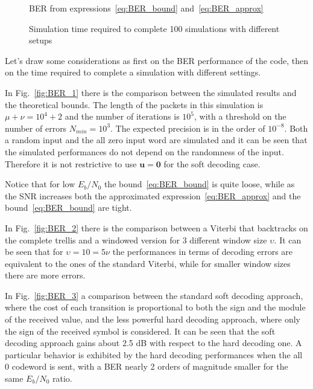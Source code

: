 \documentclass[10pt]{article}
\newlength\fheight
\newlength\fwidth
\begin{document}
\begin{figure}[t]
\centering
\setlength{}
\setlength{}

\caption{BER from expressions~\eqref{eq:BER_bound} and~\eqref{eq:BER_approx}}
\label{fig:BER_theory}
\end{figure}


\begin{figure}[t]
\centering
\setlength{}
\setlength{}

\caption{Simulation time required to complete 100 simulations with different setups}
\label{fig:perf}
\end{figure}

Let's draw some considerations as first on the BER performance of the code, then on the time required to complete a simulation with different settings.

In Fig.~\ref{fig:BER_1} there is the comparison between the simulated results and the theoretical bounds. The length of the packets in this simulation is $\mu + \nu = 10^4 + 2$ and the number of iterations is $10^5$, with a threshold on the number of errors $N_{min} = 10^3$. The expected precision is in the order of $10^{-8}$. Both a random input and the all zero input word are simulated and it can be seen that the simulated performances do not depend on the randomness of the input. Therefore it is not restrictive to use $\mathbf{u} = \mathbf{0}$ for the soft decoding case.

Notice that for low $E_b/N_0$ the bound~\eqref{eq:BER_bound} is quite loose, while as the SNR increases both the approximated expression~\eqref{eq:BER_approx} and the bound~\eqref{eq:BER_bound} are tight. 

In Fig.~\ref{fig:BER_2} there is the comparison between a Viterbi that backtracks on the complete trellis and a windowed version for 3 different window size $\upsilon$. It can be seen that for $\upsilon = 10 = 5\nu$ the performances in terms of decoding errors are equivalent to the ones of the standard Viterbi, while for smaller window sizes there are more errors. 

In Fig.~\ref{fig:BER_3} a comparison between the standard soft decoding approach, where the cost of each transition is proportional to both the sign and the module of the received value, and the less powerful hard decoding approach, where only the sign of the received symbol is considered. 
It can be seen that the soft decoding approach gains about 2.5 dB with respect to the hard decoding one. A particular behavior is exhibited by the hard decoding performances when the all 0 codeword is sent, with a BER nearly 2 orders of magnitude smaller for the same $E_b/N_0$ ratio. 
\end{document}
